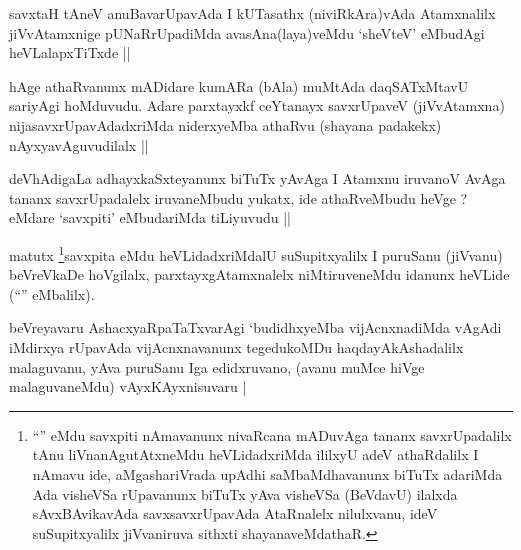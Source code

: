 
\begin{artha}
savxtaH tAneV anuBavarUpavAda I kUTasathx (niviRkAra)vAda Atamxnalilx jiVvAtamxnige pUNaRrUpadiMda avasAna(laya)veMdu `sheVteV' eMbudAgi heVLalapxTiTxde ||
\end{artha}


\begin{artha}
hAge athaRvanunx mADidare kumARa (bAla) muMtAda daqSATxMtavU sariyAgi hoMduvudu. Adare parxtayxkf ceYtanayx savxrUpaveV (jiVvAtamxna) nijasavxrUpavAdadxriMda niderxyeMba athaRvu (shayana padakekx) nAyxyavAguvudilalx ||
\end{artha}

\begin{artha}
deVhAdigaLa adhayxkaSxteyanunx biTuTx yAvAga I Atamxnu iruvanoV AvAga tananx savxrUpadalelx iruvaneMbudu yukatx, ide athaRveMbudu heVge ? eMdare `savxpiti' eMbudariMda tiLiyuvudu ||
\end{artha}


\begin{artha}
matutx \footnote{``\stext'' eMdu savxpiti nAmavanunx nivaRcana mADuvAga tananx savxrUpadalilx tAnu liVnanAgutAtxneMdu heVLidadxriMda ililxyU adeV athaRdalilx I nAmavu ide, aMgashariVrada upAdhi saMbaMdhavanunx biTuTx adariMda Ada visheVSa rUpavanunx biTuTx yAva visheVSa (BeVdavU) ilalxda sAvxBAvikavAda savxsavxrUpavAda AtaRnalelx nilulxvanu, ideV suSupitxyalilx jiVvaniruva sithxti shayanaveMdathaR.}savxpita eMdu heVLidadxriMdalU suSupitxyalilx I puruSanu (jiVvanu) beVreVkaDe hoVgilalx, parxtayxgAtamxnalelx niMtiruveneMdu idanunx heVLide (``\stext'' eMbalilx).
\end{artha}


\begin{artha}
beVreyavaru AshacxyaRpaTaTxvarAgi `budidhxyeMba vijAcnxnadiMda vAgAdi iMdirxya rUpavAda vijAcnxnavanunx tegedukoMDu haqdayAkAshadalilx malaguvanu, yAva puruSanu Iga edidxruvano, (avanu muMce hiVge malaguvaneMdu) vAyxKAyxnisuvaru |
\end{artha}


